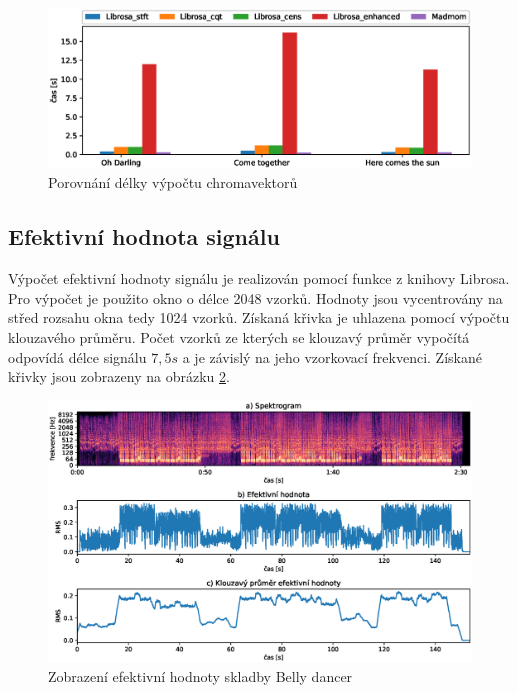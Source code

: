 \begin{figure}[H]
    \centering
    \includegraphics[width = 1\linewidth]{obrazky/Chroma_analysis_times_comparison.eps}
    \caption{Porovnání délky výpočtu chromavektorů}
    \label{fig:Chroma_calculation_time}
\end{figure}
    
\subsection{Efektivní hodnota signálu}
Výpočet efektivní hodnoty signálu je realizován pomocí funkce z knihovy Librosa. Pro výpočet je použito okno o délce 2048 vzorků. Hodnoty jsou vycentrovány na střed rozsahu okna tedy 1024 vzorků. Získaná křivka je uhlazena pomocí výpočtu klouzavého průměru. Počet vzorků ze kterých se klouzavý průměr vypočítá odpovídá délce signálu $7,5 s$ a je závislý na jeho vzorkovací frekvenci. Získané křivky jsou zobrazeny na obrázku \ref{fig:RMS_calculation}.

\begin{figure}[H]
    \centering
    \includegraphics[width = 1\linewidth]{obrazky/Belly_dancer_RMS.eps}
    \caption{Zobrazení efektivní hodnoty skladby Belly dancer}
    \label{fig:RMS_calculation}
\end{figure}

